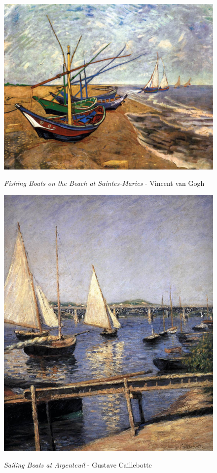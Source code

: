 \documentclass[a4paper]{article}
\begin{document}
\begin {figure}[h!]
\centering
\begin{minipage}[b]{.49\textwidth}
	\centering
	\includegraphics[width=\textwidth]{SeaPaintings/_Stl__vangoghfishingboatsonthebeachatsaintesmarries.jpg}
    \caption{\emph{Fishing Boats on the Beach at Saintes-Maries} - Vincent van Gogh}
\end{minipage}
\hfill
\begin{minipage}[b]{.49\textwidth}
	\centering
	\includegraphics[width=\textwidth]{SeaPaintings/_Stl__caillebottesailingboatsatargenteuil.jpg}
    \caption{\emph{Sailing Boats at Argenteuil} - Gustave Caillebotte}
\end{minipage}
\end{figure}
\end{document}
